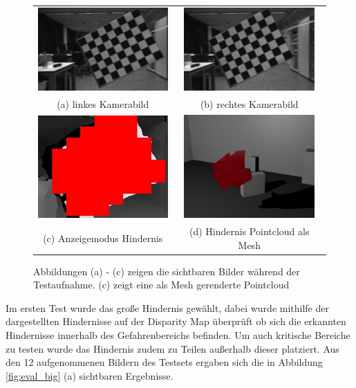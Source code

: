 	\begin{figure}[h]
		\centering
		\begin{tabular}{c c}
		\includegraphics[width=5.0cm]{img/evaluation/test_set/_test_3_left}&
		\includegraphics[width=5.0cm]{img/evaluation/test_set/_test_3_right}\\
		(a) linkes Kamerabild & (b) rechtes Kamerabild\\
		\includegraphics[width=5.0cm]{img/evaluation/test_set/_test_3_disparity}&
	    \includegraphics[width=5.0cm]{img/evaluation/test_set/rendered_obstacle}\\
		(c) Anzeigemodus Hindernis & (d) Hindernis Pointcloud als Mesh
		\end{tabular}
		\caption{Abbildungen (a) - (c) zeigen die sichtbaren Bilder während der Testaufnahme. (c) zeigt eine als Mesh gerenderte Pointcloud}
		\label{fig:test_viewing}
	\end{figure}
    
    \noindent
	Im ersten Test wurde das große Hindernis gewählt, dabei wurde mithilfe der dargestellten Hindernisse auf der Disparity Map überprüft ob sich die erkannten Hindernisse innerhalb des Gefahrenbereichs befinden. Um auch kritische Bereiche zu testen wurde das Hindernis zudem zu Teilen außerhalb dieser platziert. Aus den 12 aufgenommenen Bildern des Testsets ergaben sich die in Abbildung \ref{fig:eval_big} (a) sichtbaren Ergebnisse.\\
    
